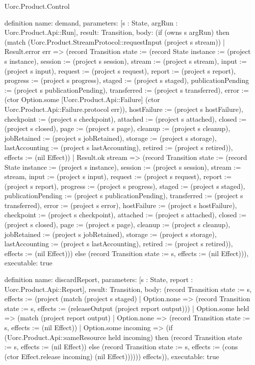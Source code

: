 \begin{lexlean}{Uorc.Product.Control}
\begin{semanticmodule}
definition{
  name: demand,
  parameters: [s : State, argRun : Uorc.Product.Api::Run],
  result: Transition,
  body: (if (owns s argRun) then (match (Uorc.Product.StreamProtocol::requestInput (project s stream))
    | Result.error err => (record Transition {state := (record State {instance := (project s instance), session := (project s session), stream := (project s stream), input := (project s input), request := (project s request), report := (project s report), progress := (project s progress), staged := (project s staged), publicationPending := (project s publicationPending), transferred := (project s transferred), error := (ctor Option.some [Uorc.Product.Api::Failure] (ctor Uorc.Product.Api::Failure.protocol err)), hostFailure := (project s hostFailure), checkpoint := (project s checkpoint), attached := (project s attached), closed := (project s closed), page := (project s page), cleanup := (project s cleanup), jobRetained := (project s jobRetained), storage := (project s storage), lastAccounting := (project s lastAccounting), retired := (project s retired)}), effects := (nil Effect)})
    | Result.ok stream => (record Transition {state := (record State {instance := (project s instance), session := (project s session), stream := stream, input := (project s input), request := (project s request), report := (project s report), progress := (project s progress), staged := (project s staged), publicationPending := (project s publicationPending), transferred := (project s transferred), error := (project s error), hostFailure := (project s hostFailure), checkpoint := (project s checkpoint), attached := (project s attached), closed := (project s closed), page := (project s page), cleanup := (project s cleanup), jobRetained := (project s jobRetained), storage := (project s storage), lastAccounting := (project s lastAccounting), retired := (project s retired)}), effects := (nil Effect)})) else (record Transition {state := s, effects := (nil Effect)})),
  executable: true
}

definition{
  name: discardReport,
  parameters: [s : State, report : Uorc.Product.Api::Report],
  result: Transition,
  body: (record Transition {state := s, effects := (project (match (project s staged)
    | Option.none => (record Transition {state := s, effects := (releaseOutput (project report output))})
    | Option.some held => (match (project report output)
      | Option.none => (record Transition {state := s, effects := (nil Effect)})
      | Option.some incoming => (if (Uorc.Product.Api::sameResource held incoming) then (record Transition {state := s, effects := (nil Effect)}) else (record Transition {state := s, effects := (cons (ctor Effect.release incoming) (nil Effect))})))) effects)}),
  executable: true
}


\end{semanticmodule}
\end{lexlean}
